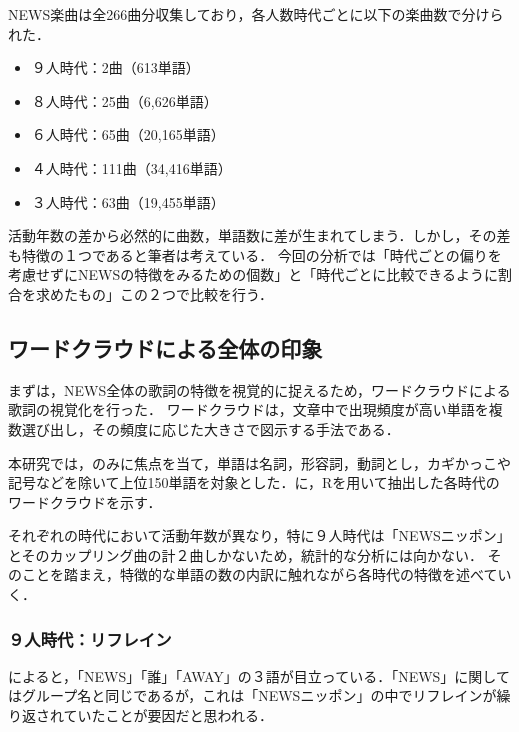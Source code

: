 NEWS楽曲は全266曲分収集しており，各人数時代ごとに以下の楽曲数で分けられた．

\begin{itemize}
	\item ９人時代：2曲（613単語）
	\item ８人時代：25曲（6,626単語）
	\item ６人時代：65曲（20,165単語）
	\item ４人時代：111曲（34,416単語）
	\item ３人時代：63曲（19,455単語）
\end{itemize}


活動年数の差から必然的に曲数，単語数に差が生まれてしまう．しかし，その差も特徴の１つであると筆者は考えている．
今回の分析では「時代ごとの偏りを考慮せずにNEWSの特徴をみるための個数」と「時代ごとに比較できるように割合を求めたもの」この２つで比較を行う．

\subsection{ワードクラウドによる全体の印象}
まずは，NEWS全体の歌詞の特徴を視覚的に捉えるため，ワードクラウド\cite{wordcloud}による歌詞の視覚化を行った．
ワードクラウドは，文章中で出現頻度が高い単語を複数選び出し，その頻度に応じた大きさで図示する手法である．

本研究では，\kaisu のみに焦点を当て，単語は名詞，形容詞，動詞とし，カギかっこや記号などを除いて上位150単語を対象とした．に，Rを用いて抽出した各時代のワードクラウドを示す．

それぞれの時代において活動年数が異なり，特に９人時代は「NEWSニッポン」とそのカップリング曲の計２曲しかないため，統計的な分析には向かない．%
そのことを踏まえ，特徴的な単語の数の内訳に触れながら各時代の特徴を述べていく．


\subsubsection{９人時代：リフレイン}
によると，「NEWS」「誰」「AWAY」の３語が目立っている．「NEWS」に関してはグループ名と同じであるが，これは「NEWSニッポン」の中でリフレインが繰り返されていたことが要因だと思われる．

